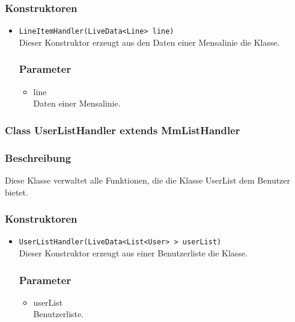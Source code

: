 \documentclass[a4paper]{scrreprt}
\begin{document}
\subsubsection*{Konstruktoren}
\begin{addmargin}[25pt]{0pt}
\begin{itemize}

\item \texttt{LineItemHandler(LiveData<Line> line)}\\
	Dieser Konstruktor erzeugt aus den Daten einer Mensalinie die Klasse.

	\subsubsection*{Parameter}
	\begin{itemize}
	\item line \\
		Daten einer Mensalinie.
	\end{itemize}

\end{itemize}
\end{addmargin}


\subsubsection{Class UserListHandler extends MmListHandler}
\subsubsection*{Beschreibung}
Diese Klasse verwaltet alle Funktionen, die die Klasse UserList dem Benutzer bietet.

\subsubsection*{Konstruktoren}
\begin{addmargin}[25pt]{0pt}
\begin{itemize}

\item \texttt{UserListHandler(LiveData<List<User> > userList)}\\
	Dieser Konstruktor erzeugt aus einer Benutzerliste die Klasse.

	\subsubsection*{Parameter}
	\begin{itemize}
	\item userList \\
		Benutzerliste.
	\end{itemize}

\end{itemize}
\end{addmargin}
\end{document}
